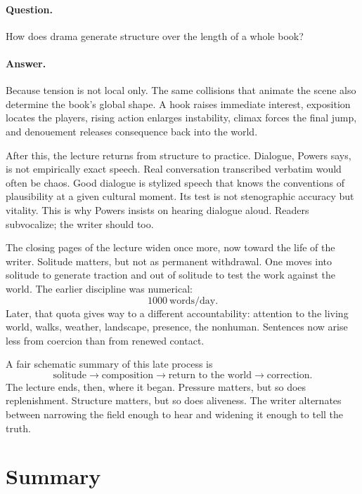 \paragraph{Question.} How does drama generate structure over the length of a whole book?

\paragraph{Answer.} Because tension is not local only. The same collisions that animate the scene also determine the book's global shape. A hook raises immediate interest, exposition locates the players, rising action enlarges instability, climax forces the final jump, and denouement releases consequence back into the world.

After this, the lecture returns from structure to practice. Dialogue, Powers says, is not empirically exact speech. Real conversation transcribed verbatim would often be chaos. Good dialogue is stylized speech that knows the conventions of plausibility at a given cultural moment. Its test is not stenographic accuracy but vitality. This is why Powers insists on hearing dialogue aloud. Readers subvocalize; the writer should too.

The closing pages of the lecture widen once more, now toward the life of the writer. Solitude matters, but not as permanent withdrawal. One moves into solitude to generate traction and out of solitude to test the work against the world. The earlier discipline was numerical:
\begin{equation}
1000\ \text{words/day}.
\end{equation}
Later, that quota gives way to a different accountability: attention to the living world, walks, weather, landscape, presence, the nonhuman. Sentences now arise less from coercion than from renewed contact.

A fair schematic summary of this late process is
\begin{equation}
\text{solitude} \to \text{composition} \to \text{return to the world} \to \text{correction}.
\end{equation}
The lecture ends, then, where it began. Pressure matters, but so does replenishment. Structure matters, but so does aliveness. The writer alternates between narrowing the field enough to hear and widening it enough to tell the truth.

\section{Summary}

